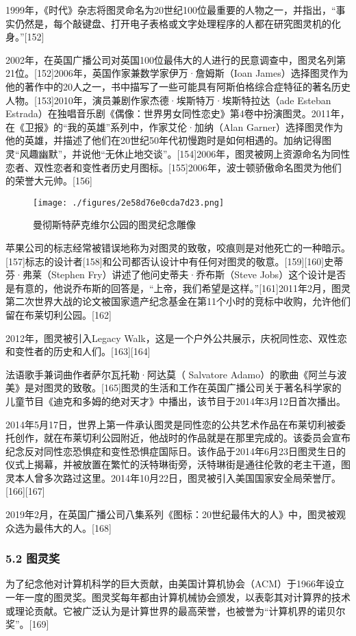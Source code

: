 1999年，《时代》杂志将图灵命名为20世纪100位最重要的人物之一，并指出，“事实仍然是，每个敲键盘、打开电子表格或文字处理程序的人都在研究图灵机的化身。”[152]

2002年，在英国广播公司对英国100位最伟大的人进行的民意调查中，图灵名列第21位。[152]2006年，英国作家兼数学家伊万·詹姆斯（Ioan James）选择图灵作为他的著作中的20人之一，书中描写了一些可能具有阿斯伯格综合症特征的著名历史人物。[153]2010年，演员兼剧作家杰德·埃斯特万·埃斯特拉达（ade Esteban Estrada）在独唱音乐剧《偶像：世界男女同性恋史》第4卷中扮演图灵。2011年，在《卫报》的“我的英雄”系列中，作家艾伦·加纳（Alan Garner）选择图灵作为他的英雄，并描述了他们在20世纪50年代初慢跑时是如何相遇的。加纳记得图灵“风趣幽默”，并说他“无休止地交谈”。[154]2006年，图灵被网上资源命名为同性恋者、双性恋者和变性者历史月图标。[155]2006年，波士顿骄傲命名图灵为他们的荣誉大元帅。[156]
\begin{figure}[ht]
\centering
\texttt{[image: ./figures/2e58d76e0cda7d23.png]}
\caption{曼彻斯特萨克维尔公园的图灵纪念雕像} \label{fig_ALTL_11}
\end{figure}
苹果公司的标志经常被错误地称为对图灵的致敬，咬痕则是对他死亡的一种暗示。[157]标志的设计者[158]和公司都否认设计中有任何对图灵的敬意。[159][160]史蒂芬·弗莱（Stephen Fry）讲述了他问史蒂夫·乔布斯（Steve Jobs）这个设计是否是有意的，他说乔布斯的回答是，“上帝，我们希望是这样。”[161]2011年2月，图灵第二次世界大战的论文被国家遗产纪念基金在第11个小时的竞标中收购，允许他们留在布莱切利公园。[162]

2012年，图灵被引入Legacy Walk，这是一个户外公共展示，庆祝同性恋、双性恋和变性者的历史和人们。[163][164]

法语歌手兼词曲作者萨尔瓦托勒·阿达莫（ Salvatore Adamo）的歌曲《阿兰与波美》是对图灵的致敬。[165]图灵的生活和工作在英国广播公司关于著名科学家的儿童节目《迪克和多姆的绝对天才》中播出，该节目于2014年3月12日首次播出。

2014年5月17日，世界上第一件承认图灵是同性恋的公共艺术作品在布莱切利被委托创作，就在布莱切利公园附近，他战时的作品就是在那里完成的。该委员会宣布纪念反对同性恋恐惧症和变性恐惧症国际日。该作品于2014年6月23日图灵生日的仪式上揭幕，并被放置在繁忙的沃特琳街旁，沃特琳街是通往伦敦的老主干道，图灵本人曾多次路过这里。2014年10月22日，图灵被引入美国国家安全局荣誉厅。[166][167]

2019年2月，在英国广播公司八集系列《图标：20世纪最伟大的人》中，图灵被观众选为最伟大的人。[168]
\subsubsection{5.2 图灵奖}
为了纪念他对计算机科学的巨大贡献，由美国计算机协会（ACM）于1966年设立一年一度的图灵奖。图灵奖每年都由计算机械协会颁发，以表彰其对计算界的技术或理论贡献。它被广泛认为是计算世界的最高荣誉，也被誉为“计算机界的诺贝尔奖”。[169]
